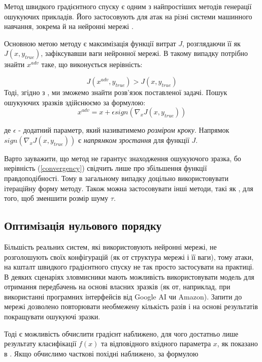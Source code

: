\documentclass[14pt,a4paper]{extarticle}
\newcounter{e}
\numberwithin{equation}{section}
\numberwithin{figure}{section}
\begin{document}
 Метод швидкого градієнтного спуску є одним з найпростіших методів генерації ошукуючих прикладів. Його застосовують для атак на різні системи машинного навчання, зокрема й на нейронні мережі \cite{explaining-a-e}.

 Основною метою методу є максимізація функції витрат $J$, розглядаючи її як $J(x, y_{true})$, зафіксувавши ваги нейронної мережі. В такому випадку потрібно знайти $x^{adv}$ таке, що виконується нерівність: 

 \begin{equation}
 J\left(x^{adv}, y_{true}\right)>J\left(x, y_{true}\right)
 \label{convergency}
 \end{equation}
 Тоді, згідно з \cite{quarteroni}, ми зможемо знайти розв'язок поставленої задачі. Пошук ошукуючих зразків здійснюємо за формулою:
 \begin{equation}
 x^{adv} = x + \epsilon {sign}\left(\nabla_x J\left(x, y_{true}\right)\right)
 \label{FGSM}
 \end{equation}
 
 де $\epsilon$ - додатний параметр, який називатимемо \textit{розміром кроку}. Напрямок ${sign}\left(\nabla_x J\left(x, y_{true}\right)\right)$ є \textit{напрямком зростання} для функції $J$.

 Варто зауважити, що метод не гарантує знаходження ошукуючого зразка, бо нерівність (\ref{convergency}) свідчить лише про збільшення функції правдоподібності. Тому в загальному випадку доцільно використовувати ітераційну форму методу. Також можна застосовувати інші методи, такі як \cite{C-and-W}, для того, щоб зменшити розмір шуму $\tau$.


 \subsection{Оптимізація нульового порядку}
 Більшість реальних систем, які використовують нейронні мережі, не розголошують своїх конфігурацій (як от структура мережі і її ваги), тому атаки, на кшталт швидкого градієнтного спуску не так просто застосувати на практиці. В деяких сценаріях зловмисники мають можливість використовувати модель для отримання передбачень на основі власних зразків (як от, наприклад, при використанні  програмних інтерфейсів від Google AI чи Amazon). Запити до мережі  дозволено повторювати необмежену кількість разів і на основі результатів покращувати ошукуючі зразки.

 Тоді є можливість обчислити градієнт наближено, для чого достатньо лише результату класифікації $f(x)$ та відповідного вхідного параметра $x$, як показано в \cite{zoo}. Якщо обчислимо часткові похідні наближено, за формулою
\end{document}

